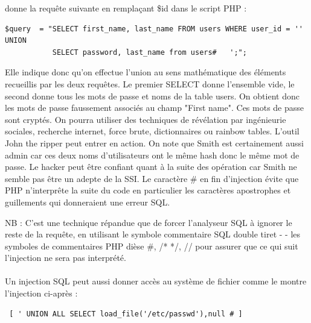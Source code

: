 
donne la requête suivante en remplaçant \$id dans le script PHP :

{\color{red}
\begin{verbatim}
$query  = "SELECT first_name, last_name FROM users WHERE user_id = '' UNION 
           SELECT password, last_name from users#   ';"; 
\end{verbatim}
}
Elle indique donc qu'on effectue l'union au sens mathématique des éléments recueillis par les deux requêtes. Le premier SELECT donne l'ensemble vide, le second donne tous les mots de passe et noms de la table users. On obtient donc les mots de passe faussement associés au champ "First name". Ces mots de passe sont cryptés. On pourra utiliser des techniques de révélation par ingénieurie sociales, recherche internet, force brute, dictionnaires ou rainbow tables. L'outil John the ripper peut entrer en action. On note que Smith est certainement aussi admin car ces deux noms d'utilisateurs ont le même hash donc le même mot de passe. Le hacker peut être confiant quant à la suite des opération car Smith ne semble pas être un adepte de la SSI. Le caractère \# en fin d'injection évite que PHP n'interprête la suite du code en particulier les caractères apostrophes et guillements qui donneraient une erreur SQL.

NB : C'est une technique répandue que de forcer l'analyseur SQL à ignorer le reste de la requête, en utilisant le symbole commentaire SQL double tiret - - les symboles de commentaires PHP dièse \#, {/* */}, {//} pour assurer que ce qui suit l'injection ne sera pas interprété.  



\paragraph{}
Un injection SQL peut aussi donner accès au système de fichier comme le montre l'injection ci-après :
\begin{verbatim} [ ' UNION ALL SELECT load_file('/etc/passwd'),null # ] \end{verbatim}

